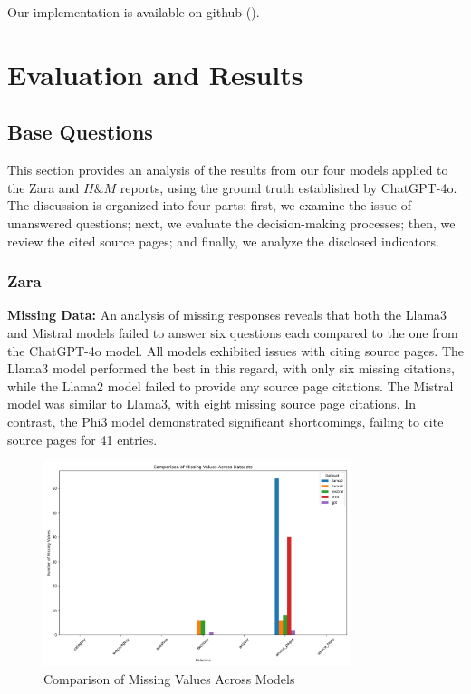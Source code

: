 \documentclass[]{article}
\begin{document}
Our implementation is available on github (\cite{github}).

\section{Evaluation and Results} \label{sec:evaluation}
\subsection{Base Questions}
This section provides an analysis of the results from our four models applied to the Zara and $H\&M$ reports, using the ground truth established by ChatGPT-4o.
The discussion is organized into four parts: first, we examine the issue of unanswered questions; 
next, we evaluate the decision-making processes; then, we review the cited source pages; and finally, 
we analyze the disclosed indicators.
\subsubsection{Zara}
\textbf{Missing Data:} An analysis of missing responses reveals that both the Llama3 and 
Mistral models failed to answer six questions each compared to the one from the ChatGPT-4o model.
All models exhibited issues with citing source pages. 
The Llama3 model performed the best in this regard, with only six missing citations, 
while the Llama2 model failed to provide any source page citations. The Mistral model was similar to Llama3, 
with eight missing source page citations. In contrast, the Phi3 model demonstrated significant shortcomings, 
failing to cite source pages for 41 entries.

\begin{figure}[H]
    \centering
    \includegraphics[width=0.8\textwidth]{./images/Missing_Values.png}
    \caption{Comparison of Missing Values Across Models}
    \label{fig:image_label}
\end{figure}
\end{document}
